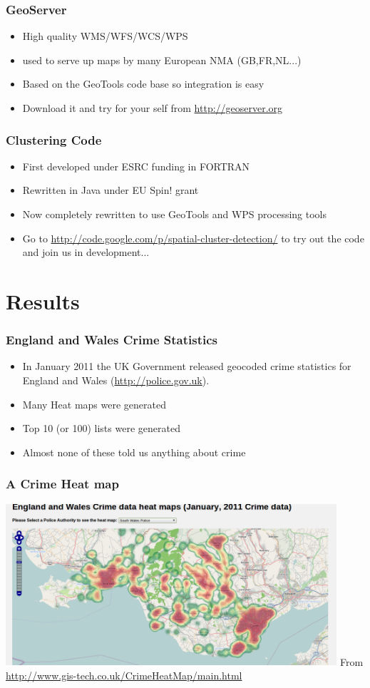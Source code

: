 \documentclass{beamer}
\begin{document}
\begin{frame}[t]
\frametitle{GeoServer}
\begin{itemize}
  \item High quality WMS/WFS/WCS/WPS
  \item used to serve up maps by many European NMA (GB,FR,NL...)
  \item Based on the GeoTools code base so integration is easy
  \item Download it and try for your self from \url{http://geoserver.org}
\end{itemize}
\end{frame}

\begin{frame}[t]
\frametitle{Clustering Code}
\begin{itemize}
  \item First developed under ESRC funding in FORTRAN
  \item Rewritten in Java under EU Spin! grant
  \item Now completely rewritten to use GeoTools and WPS processing tools
  \item Go to \url{http://code.google.com/p/spatial-cluster-detection/} to try out the code and join us in development... 
\end{itemize}
\end{frame}


\section{Results}

\begin{frame}[t]
\frametitle{England and Wales Crime Statistics}
\begin{itemize}
  \item In January 2011 the UK Government released geocoded crime statistics for England and Wales (\url{http://police.gov.uk}). 
  \item Many Heat maps were generated 
  \item Top 10 (or 100) lists were generated
  \item Almost none of these told us anything about crime
\end{itemize}
\end{frame}

\begin{frame}[t]
\frametitle{A Crime Heat map}
\includegraphics[height=6.0cm]{HeatMap.png}
From \href{http://www.gis-tech.co.uk/CrimeHeatMap/main.html}{http://www.gis-tech.co.uk/CrimeHeatMap/main.html}
\end{frame}
\end{document}
